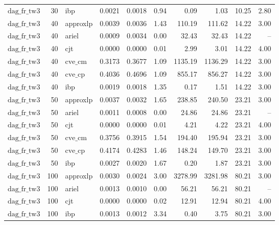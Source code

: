 \begin{table}[ht]
\begin{tabular}{lrlrrrrrrr}
$\text{dag\_fr\_tw3}$ & 30 & ibp & 0.0021 & 0.0018 & 0.94 & 0.09 & 1.03 & 10.25 & 2.80 \\
$\text{dag\_fr\_tw3}$ & 40 & approxlp & 0.0039 & 0.0036 & 1.43 & 110.19 & 111.62 & 14.22 & 3.00 \\
$\text{dag\_fr\_tw3}$ & 40 & ariel & 0.0009 & 0.0034 & 0.00 & 32.43 & 32.43 & 14.22 & -- \\
$\text{dag\_fr\_tw3}$ & 40 & cjt & 0.0000 & 0.0000 & 0.01 & 2.99 & 3.01 & 14.22 & 4.00 \\
$\text{dag\_fr\_tw3}$ & 40 & $\text{cve\_cm}$ & 0.3173 & 0.3677 & 1.09 & 1135.19 & 1136.29 & 14.22 & 3.00 \\
$\text{dag\_fr\_tw3}$ & 40 & $\text{cve\_cp}$ & 0.4036 & 0.4696 & 1.09 & 855.17 & 856.27 & 14.22 & 3.00 \\
$\text{dag\_fr\_tw3}$ & 40 & ibp & 0.0019 & 0.0018 & 1.35 & 0.17 & 1.51 & 14.22 & 3.00 \\
$\text{dag\_fr\_tw3}$ & 50 & approxlp & 0.0037 & 0.0032 & 1.65 & 238.85 & 240.50 & 23.21 & 3.00 \\
$\text{dag\_fr\_tw3}$ & 50 & ariel & 0.0011 & 0.0008 & 0.00 & 24.86 & 24.86 & 23.21 & -- \\
$\text{dag\_fr\_tw3}$ & 50 & cjt & 0.0000 & 0.0000 & 0.01 & 4.21 & 4.22 & 23.21 & 4.00 \\
$\text{dag\_fr\_tw3}$ & 50 & $\text{cve\_cm}$ & 0.3756 & 0.3915 & 1.54 & 194.40 & 195.94 & 23.21 & 3.00 \\
$\text{dag\_fr\_tw3}$ & 50 & $\text{cve\_cp}$ & 0.4174 & 0.4283 & 1.46 & 148.24 & 149.70 & 23.21 & 3.00 \\
$\text{dag\_fr\_tw3}$ & 50 & ibp & 0.0027 & 0.0020 & 1.67 & 0.20 & 1.87 & 23.21 & 3.00 \\
$\text{dag\_fr\_tw3}$ & 100 & approxlp & 0.0030 & 0.0024 & 3.00 & 3278.99 & 3281.98 & 80.21 & 3.00 \\
$\text{dag\_fr\_tw3}$ & 100 & ariel & 0.0013 & 0.0010 & 0.00 & 56.21 & 56.21 & 80.21 & -- \\
$\text{dag\_fr\_tw3}$ & 100 & cjt & 0.0000 & 0.0000 & 0.02 & 12.91 & 12.94 & 80.21 & 4.00 \\
$\text{dag\_fr\_tw3}$ & 100 & ibp & 0.0013 & 0.0012 & 3.34 & 0.40 & 3.75 & 80.21 & 3.00 \\
\bottomrule
\end{tabular}
\end{table}

